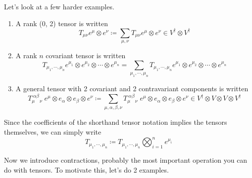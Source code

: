 	\begin{example}
	  \label{ex:more-complicated-tensors-in-einstein-summation}
		Let's look at a few harder examples. 
		\begin{enumerate}
		  \item A rank (0, 2) tensor is written  
				\begin{equation}
					T_{\mu \nu} e^{\mu} \otimes e^{\nu} \coloneqq \sum_{\mu, \nu} T_{\mu \nu} e^{\mu} \otimes e^{\nu} \in V^\dagger \otimes V^\dagger
				\end{equation}

			\item A rank $n$ covariant tensor is written
				\begin{equation}
					T_{\mu_{1}, \cdots, \mu_{n}} e^{\mu_{1}} \otimes e^{\mu_{2}} \otimes \cdots \otimes e^{\mu_{n}} = \sum_{\mu_{1}, \cdots, \mu_{n}} T_{\mu_{1}, \cdots, \mu_{n}} e^{\mu_{1}} \otimes e^{\mu_{2}} \otimes \cdots \otimes e^{\mu_{n}}
				\end{equation}

			\item A general tensor with 2 covariant and 2 contravariant components is written 
				\begin{equation}
					T_{\mu \quad\nu}^{\; \alpha \beta} \; e^{\mu} \otimes e_{\alpha} \otimes e_{\beta} \otimes e^{\nu}  \coloneqq \sum_{\mu, \alpha, \beta, \nu} T_{\mu \quad \nu}^{\; \alpha \beta} \; e^{\mu} \otimes e_{\alpha} \otimes e_{\beta} \otimes e^{\nu} \in V^\dagger \otimes V \otimes V \otimes V^\dagger
				\end{equation}
		\end{enumerate}
		Since the coefficients of the shorthand tensor notation implies the tensors themselves, we can simply write
		\begin{equation}
			T_{\mu_{1}, \cdots, \mu_{n}} \coloneqq T_{\mu_{1}, \cdots, \mu_{n}} \bigotimes_{i=1}^{n} e^{\mu_{i}}
		\end{equation}
	\end{example}

	Now we introduce contractions, probably the most important operation you can do with tensors. To motivate this, let's do 2 examples. 

